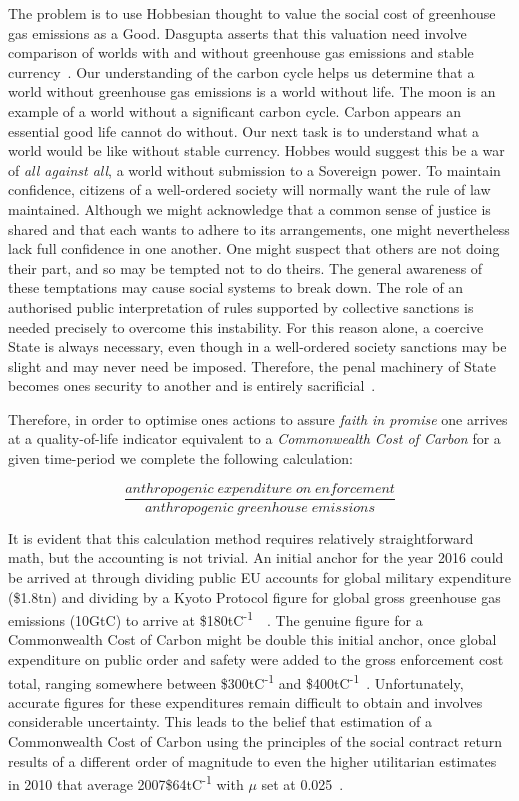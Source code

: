 \documentclass[11pt, oneside]{book}   	%
\begin{document}
The problem is to use Hobbesian thought to value the social cost of greenhouse gas emissions as a Good.
Dasgupta asserts that this valuation need involve comparison of worlds with and without greenhouse gas emissions and stable currency~\cite{pd2}.
Our understanding of the carbon cycle helps us determine that a world without greenhouse gas emissions is a world without life.
The moon is an example of a world without a significant carbon cycle.
Carbon appears an essential good life cannot do without.
Our next task is to understand what a world would be like without stable currency.
Hobbes would suggest this be a war of \emph{all against all}, a world without submission to a Sovereign power.
To maintain confidence, citizens of a well-ordered society will normally want the rule of law maintained.
Although we might acknowledge that a common sense of justice is shared and that each wants to adhere to its arrangements, one might nevertheless lack full confidence in one another.
One might suspect that others are not doing their part, and so may be tempted not to do theirs.
The general awareness of these temptations may cause social systems to break down.
The role of an authorised public interpretation of rules supported by collective sanctions is needed precisely to overcome this instability.
For this reason alone, a coercive State is always necessary, even though in a well-ordered society sanctions may be slight and may never need be imposed.
Therefore, the penal machinery of State becomes ones security to another and is entirely sacrificial~\cite{jr1}.\par

Therefore, in order to optimise ones actions to assure \emph{faith in promise} one arrives at a quality-of-life indicator equivalent to a \emph{Commonwealth Cost of Carbon} for a given time-period we complete the following calculation:

\begin{equation}
	\frac{anthropogenic\; expenditure\; on\; enforcement}{anthropogenic\; greenhouse\; emissions}
\end{equation}

It is evident that this calculation method requires relatively straightforward math, but the accounting is not trivial.
An initial anchor for the year 2016 could be arrived at through dividing public EU accounts for global military expenditure (\$1.8tn) and dividing by a Kyoto Protocol figure for global gross greenhouse gas emissions (10GtC) to arrive at \$180tC\textsuperscript{-1}~\cite{eu1}~\cite{co1}.
The genuine figure for a Commonwealth Cost of Carbon might be double this initial anchor, once global expenditure on public order and safety were added to the gross enforcement cost total, ranging somewhere between \$300tC\textsuperscript{-1} and \$400tC\textsuperscript{-1}~\cite{oecd1}.
Unfortunately, accurate figures for these expenditures remain difficult to obtain and involves considerable uncertainty.
This leads to the belief that estimation of a Commonwealth Cost of Carbon using the principles of the social contract return results of a different order of magnitude to even the higher utilitarian estimates in 2010 that average 2007\$64tC\textsuperscript{-1}  with $\mu$ set at 0.025~\cite{iwg1}.
\end{document}
